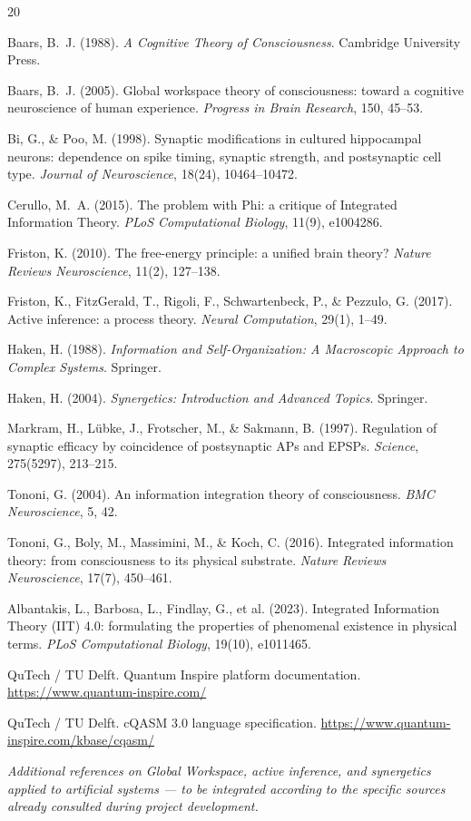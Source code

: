 \documentclass[11pt,a4paper]{article}
\begin{document}
\begin{thebibliography}{20}

 Baars, B.~J. (1988). \emph{A Cognitive Theory of Consciousness}. Cambridge University Press.

 Baars, B.~J. (2005). Global workspace theory of consciousness: toward a cognitive neuroscience of human experience. \emph{Progress in Brain Research}, 150, 45--53.

 Bi, G., \& Poo, M. (1998). Synaptic modifications in cultured hippocampal neurons: dependence on spike timing, synaptic strength, and postsynaptic cell type. \emph{Journal of Neuroscience}, 18(24), 10464--10472.

 Cerullo, M.~A. (2015). The problem with Phi: a critique of Integrated Information Theory. \emph{PLoS Computational Biology}, 11(9), e1004286.

 Friston, K. (2010). The free-energy principle: a unified brain theory? \emph{Nature Reviews Neuroscience}, 11(2), 127--138.

 Friston, K., FitzGerald, T., Rigoli, F., Schwartenbeck, P., \& Pezzulo, G. (2017). Active inference: a process theory. \emph{Neural Computation}, 29(1), 1--49.

 Haken, H. (1988). \emph{Information and Self-Organization: A Macroscopic Approach to Complex Systems}. Springer.

 Haken, H. (2004). \emph{Synergetics: Introduction and Advanced Topics}. Springer.

 Markram, H., L\"ubke, J., Frotscher, M., \& Sakmann, B. (1997). Regulation of synaptic efficacy by coincidence of postsynaptic APs and EPSPs. \emph{Science}, 275(5297), 213--215.

 Tononi, G. (2004). An information integration theory of consciousness. \emph{BMC Neuroscience}, 5, 42.

 Tononi, G., Boly, M., Massimini, M., \& Koch, C. (2016). Integrated information theory: from consciousness to its physical substrate. \emph{Nature Reviews Neuroscience}, 17(7), 450--461.

 Albantakis, L., Barbosa, L., Findlay, G., et al. (2023). Integrated Information Theory (IIT) 4.0: formulating the properties of phenomenal existence in physical terms. \emph{PLoS Computational Biology}, 19(10), e1011465.

 QuTech / TU Delft. Quantum Inspire platform documentation. \url{https://www.quantum-inspire.com/}

 QuTech / TU Delft. cQASM 3.0 language specification. \url{https://www.quantum-inspire.com/kbase/cqasm/}

\end{thebibliography}

\medskip
\noindent\emph{Additional references on Global Workspace, active inference, and synergetics applied to artificial systems --- to be integrated according to the specific sources already consulted during project development.}
\end{document}
